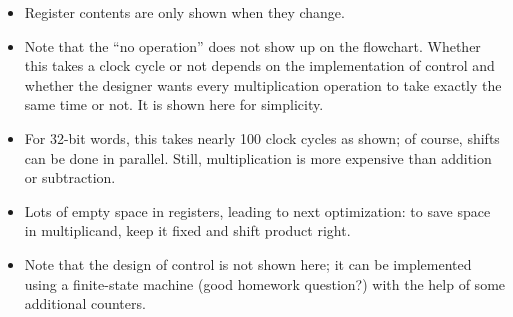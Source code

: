\begin{frame}[fragile]
\BNotes\ifnum{}
\begin{itemize}
\item Register contents are only shown when they change.
\item Note that the ``no operation'' does not show up on the
flowchart. Whether this takes a clock cycle or not depends on the
implementation of control and whether the designer wants every
multiplication operation to take exactly the same time or not. It is
shown here for simplicity.
\item For 32-bit words, this takes nearly 100 clock cycles as shown;
of course, shifts can be done in parallel. Still, multiplication is
more expensive than addition or subtraction.
\item Lots of empty space in registers, leading to next optimization:
to save space in multiplicand, keep it fixed and shift product right.
\item Note that the design of control is not shown here; it can be
implemented using a finite-state machine (good homework question?)
with the help of some additional counters.
\end{itemize}


\fi\ENotes
\end{frame}

 

